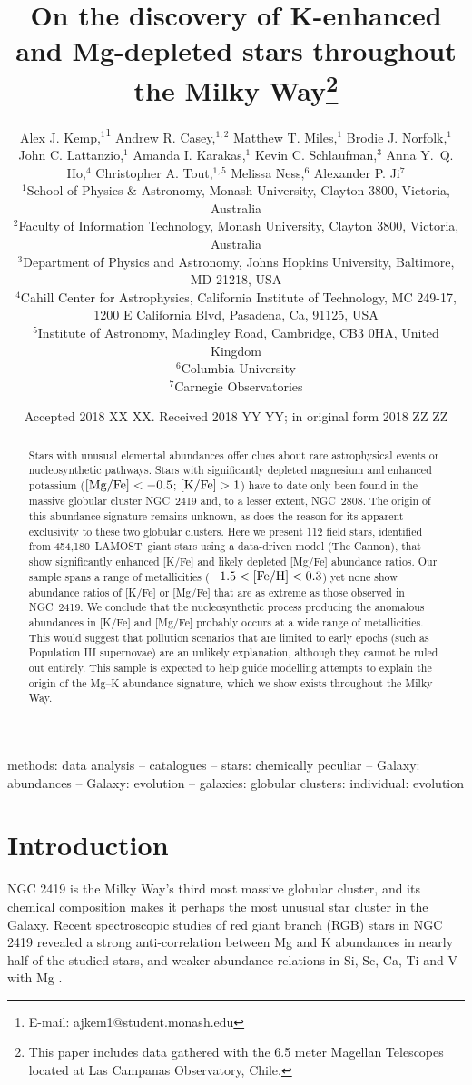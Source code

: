 \documentclass[a4paper,fleqn,usenatbib]{mnras}
\title[Mg--K stars in LAMOST]{On the discovery of K-enhanced and Mg-depleted stars throughout the Milky Way\footnote{This paper includes data gathered with the 6.5 meter Magellan Telescopes located at Las Campanas Observatory, Chile.}}
\author[Kemp et al.]{Alex J. Kemp,$^{1}$\thanks{E-mail: ajkem1@student.monash.edu}
Andrew R. Casey,$^{1,2}$
Matthew T. Miles,$^{1}$
Brodie J. Norfolk,$^{1}$\newauthor
John C. Lattanzio,$^{1}$
Amanda I. Karakas,$^{1}$
Kevin C. Schlaufman,$^{3}$
Anna Y.~Q. Ho,$^{4}$\newauthor
Christopher A. Tout,$^{1,5}$
Melissa Ness,$^{6}$
Alexander P. Ji$^{7}$
\\
$^{1}$School of Physics \& Astronomy, Monash University, Clayton 3800, Victoria, Australia\\
$^{2}$Faculty of Information Technology, Monash University, Clayton 3800, Victoria, Australia\\
$^{3}$Department of Physics and Astronomy, Johns Hopkins University, Baltimore, MD 21218, USA\\
$^{4}$Cahill Center for Astrophysics, California Institute of Technology, MC 249-17, 1200 E California Blvd, Pasadena, Ca, 91125, USA\\
$^{5}$Institute of Astronomy, Madingley Road, Cambridge, CB3 0HA, United Kingdom\\
$^{6}$Columbia University\\
$^{7}$Carnegie Observatories
}
\date{Accepted 2018 XX XX. Received 2018 YY YY; in original form 2018 ZZ ZZ}
\newcommand{\LamostGiants}{454,180}
\newcommand{\project}[1]{#1}
\newcommand{\lamost}{\project{LAMOST}}
\newcommand{\tc}{\project{The Cannon}}
\let\ACMmaketitle=\maketitle
\renewcommand{\maketitle}{\begingroup\let\footnote=\thanks \ACMmaketitle\endgroup}
\begin{document}
\label{firstpage}
\pagerange{\pageref{firstpage}--\pageref{lastpage}}
\maketitle


\begin{abstract}
Stars with unusual elemental abundances offer clues about rare astrophysical events or nucleosynthetic pathways. Stars with significantly depleted magnesium and enhanced potassium ($[{\rm Mg}/{\rm Fe}] < -0.5$; $[{\rm K}/{\rm Fe}] > 1$) have to date only been found in the massive globular cluster NGC~2419 and, to a lesser extent, NGC~2808. The origin of this abundance signature remains unknown, as does the reason for its apparent exclusivity to these two globular clusters. Here we present
112 field stars, identified from \LamostGiants\ \lamost\ giant stars using a data-driven model (\tc), that show significantly enhanced [K/Fe] and likely depleted [Mg/Fe] abundance ratios.
Our sample spans a range of metallicities ($-1.5 < [{\rm Fe}/{\rm H}] < 0.3$) yet none show abundance ratios of [K/Fe] or [Mg/Fe] that are as extreme as those observed in NGC~2419. 
We conclude that the nucleosynthetic process producing the anomalous abundances in [K/Fe] and [Mg/Fe] probably occurs at a wide range of metallicities. This would suggest that pollution scenarios that are limited to early epochs (such as Population III supernovae) are an unlikely explanation, although they cannot be ruled out entirely. This sample is expected to help guide modelling  attempts to explain the origin of the Mg--K abundance signature, which we show exists throughout the Milky Way.
\end{abstract}

\begin{keywords}
methods: data analysis -- catalogues -- stars: chemically peculiar -- Galaxy: abundances -- Galaxy: evolution -- galaxies: globular clusters: individual: evolution
\end{keywords}



\section{Introduction}
\label{sec:intro}
NGC 2419 is the Milky Way's third most massive globular cluster, and its chemical composition makes it perhaps the most unusual star cluster in the Galaxy. Recent spectroscopic studies of red giant branch (RGB) stars in NGC 2419 revealed a strong anti-correlation between Mg and K abundances in nearly half of the studied stars, and weaker abundance relations in Si, Sc, Ca, Ti and V with Mg \citep{mucciarelli2012,cohenkirby2012}.
\end{document}
